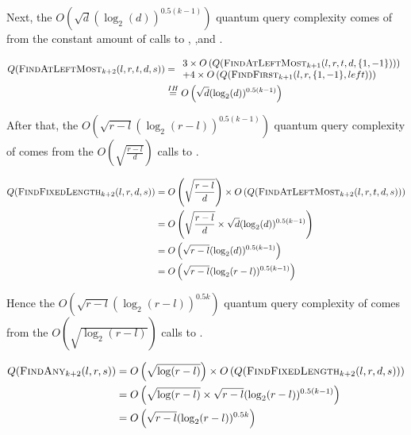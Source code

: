 \begin{appendix}
\begin{tproof}
{            Next, the $ O\left(\sqrt{d}(\log_2(d))^{0.5(k-1)} \right)$ quantum query complexity comes of from the constant amount
            of calls to ,  ,and .

            \begin{align*}
                Q(\textrm{\textsc{FindAtLeftMost$_{k+2}$}}(l,r,t,d,s)) & = \begin{array}{l}
                    3 \times O\left(Q(\textrm{\textsc{FindAtLeftMost$_{k+1}$}}(l,r,t,d,\{1,-1\}))\right) \\
                    + 4 \times O\left(Q(\textrm{\textsc{FindFirst$_{k+1}$}}(l,r,\{1,-1\},left))\right)
                \end{array}                                  \\
                                                  & \overset{IH}{=} O\left(\sqrt{d}(\log_2(d))^{0.5(k-1)} \right)
            \end{align*}

            After that, the $O\left( \sqrt{r-l}(\log_2(r-l))^{0.5(k-1)}\right)$ quantum query complexity of  comes from the
            $O\left(\sqrt{\frac{r-l}{d}}\right)$ calls to .

            \begin{align*}
                Q(\textrm{\textsc{FindFixedLength$_{k+2}$}}(l, r, d, s)) & = O\left(\sqrt{\frac{r-l}{d}}\right) \times O\left(Q(\textrm{\textsc{FindAtLeftMost$_{k+2}$}}(l,r,t,d,s))\right) \\
                                                  & = O\left( \sqrt{\frac{r-l}{d}} \times \sqrt{d}(\log_2(d))^{0.5(k-1)}\right)                 \\
                                                  & = O\left( \sqrt{r-l}(\log_2(d))^{0.5(k-1)}\right)                                           \\
                                                  & = O\left( \sqrt{r-l}(\log_2(r-l))^{0.5(k-1)}\right)
            \end{align*}

            Hence the $O\left( \sqrt{r-l}(\log_2(r-l))^{0.5k} \right)$ quantum query complexity of  comes from
            the $O\left(\sqrt{\log_2(r-l)}\right)$ calls to .

            \begin{align*}
                Q(\textrm{\textsc{FindAny$_{k+2}$}}(l, r, s)) & = O\left(\sqrt{\log(r-l)}\right) \times O\left(Q(\textrm{\textsc{FindFixedLength$_{k+2}$}}(l, r, d, s))\right) \\
                                              & = O\left( \sqrt{\log(r-l)} \times \sqrt{r-l}(\log_2(r-l))^{0.5(k-1)} \right)            \\
                                              & = O\left( \sqrt{r-l}(\log_2(r-l))^{0.5k} \right)                                        \\
            \end{align*}

}
\end{tproof}
\end{appendix}
